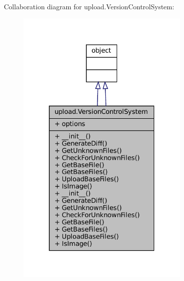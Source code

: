 Collaboration diagram for upload.\+Version\+Control\+System\+:
\nopagebreak
\begin{figure}[H]
\begin{center}
\leavevmode
\includegraphics[width=241pt]{classupload_1_1VersionControlSystem__coll__graph}
\end{center}
\end{figure}
